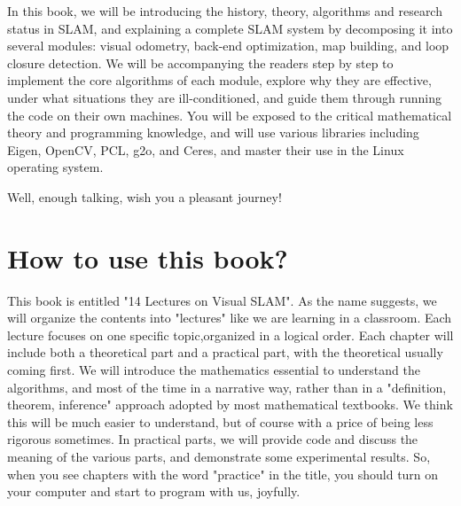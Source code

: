 In this book, we will be introducing the history, theory, algorithms and research status in SLAM, and explaining a complete SLAM system by decomposing it into several modules: visual odometry, back-end optimization, map building, and loop closure detection. We will be accompanying the readers step by step to implement the core algorithms of each module, explore why they are effective, under what situations they are ill-conditioned, and guide them through running the code on their own machines. You will be exposed to the critical mathematical theory and programming knowledge, and will use various libraries including Eigen, OpenCV, PCL, g2o, and Ceres, and master their use in the Linux operating system.

Well, enough talking, wish you a pleasant journey!

\section{How to use this book?}

This book is entitled "14 Lectures on Visual SLAM". As the name suggests, we will organize the contents into "lectures" like we are learning in a classroom. Each lecture focuses on one specific topic,organized in a logical order. Each chapter will include both a theoretical part and a practical part, with the theoretical usually coming first. We will introduce the mathematics essential to understand the algorithms, and most of the time in a narrative way, rather than in a "definition, theorem, inference" approach adopted by most mathematical textbooks. We think this will be much easier to understand, but of course with a price of being less rigorous sometimes. In practical parts, we will provide code and discuss the meaning of the various parts, and demonstrate some experimental results. So, when you see chapters with the word "practice" in the title, you should turn on your computer and start to program with us, joyfully.

